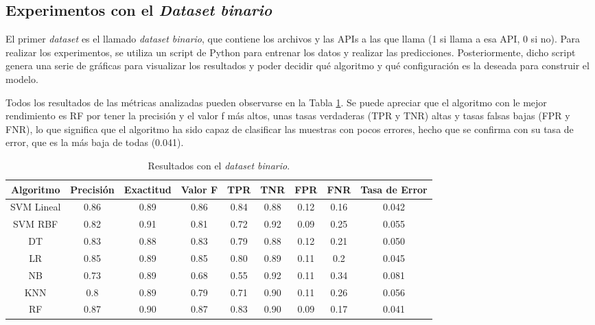 \subsection{Experimentos con el \textit{Dataset binario}} \label{sec:exp1}

\noindent El primer \textit{dataset} es el llamado \textit{dataset binario}, que contiene los archivos y las \gls{API}s a las que llama (1 si llama a esa \gls{API}, 0 si no). Para realizar los experimentos, se utiliza un script de Python para entrenar los datos y realizar las predicciones. Posteriormente, dicho script genera una serie de gráficas para visualizar los resultados y poder decidir qué algoritmo y qué configuración es la deseada para construir el modelo.

Todos los resultados de las métricas analizadas pueden observarse en la Tabla \ref{tab:rto_binario_nokfold}. Se puede apreciar que el algoritmo con le mejor rendimiento es \gls{RF} por tener la precisión y el valor f más altos, unas tasas verdaderas (\gls{TPR} y \gls{TNR}) altas y tasas falsas bajas (\gls{FPR} y \gls{FNR}), lo que significa que el algoritmo ha sido capaz de clasificar las muestras con pocos errores, hecho que se confirma con su tasa de error, que es la más baja de todas (0.041).

\begin{table}[h!]
    \centering
    \scriptsize %
    \caption{Resultados con el \textit{dataset binario}.}
    \begin{tabular}{|c|c|c|c|c|c|c|c|c|}
        \hline
        \rowcolor[HTML]{C0C0C0} 
        \textbf{Algoritmo} & \textbf{Precisión} & \textbf{Exactitud} & \textbf{Valor F} & \textbf{\gls{TPR}} & \textbf{\gls{TNR}} & \textbf{\gls{FPR}} & \textbf{\gls{FNR}} & \textbf{Tasa de Error}\\ \hline
        
        \gls{SVM} Lineal & 0.86 & 0.89 & 0.86 & 0.84 & 0.88 & 0.12 & 0.16 & 0.042\\ \hline
        \gls{SVM} \gls{RBF} & 0.82 & 0.91 & 0.81 & 0.72 & 0.92 & 0.09 & 0.25 & 0.055 \\ \hline
        \gls{DT} & 0.83 & 0.88 & 0.83 & 0.79 & 0.88 & 0.12 & 0.21 & 0.050\\ \hline
        \gls{LR} & 0.85 & 0.89 & 0.85 & 0.80 & 0.89 & 0.11 & 0.2 & 0.045\\ \hline
        \gls{NB} & 0.73 & 0.89 & 0.68 & 0.55 & 0.92 & 0.11 & 0.34 & 0.081\\ \hline
        \gls{KNN} & 0.8 & 0.89 & 0.79 & 0.71 & 0.90 & 0.11 & 0.26 & 0.056\\ \hline
        \gls{RF} & 0.87 & 0.90 & 0.87 & 0.83 & 0.90 & 0.09 & 0.17 & 0.041\\ \hline
        
    \end{tabular}
    \label{tab:rto_binario_nokfold}
\end{table}

